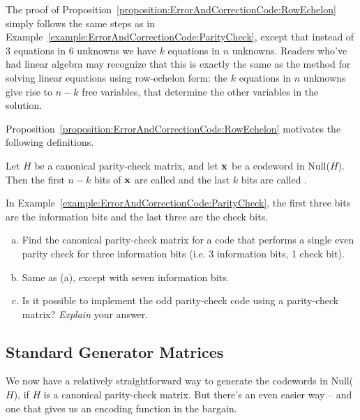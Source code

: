 The proof of Proposition~\ref{proposition:ErrorAndCorrectionCode:RowEchelon} simply follows the same steps as in Example~\ref{example:ErrorAndCorrectionCode:ParityCheck}, except that instead of 3 equations in 6 unknowns we have $k$ equations in $n$ unknowns. Readers who've had linear algebra may recognize that this is exactly the same as the method for solving linear equations using row-echelon form: the $k$ equations in $n$ unknowns give rise to $n-k$ free variables, that determine the other variables in the solution.

 Proposition~\ref{proposition:ErrorAndCorrectionCode:RowEchelon} motivates the following definitions.
 
 \begin{defn}
 Let $H$ be a canonical parity-check matrix, and let ${\bold x}$ be a codeword in Null($H$). Then the first $n-k$ bits of ${\bold x}$ are called   and the last $k$ bits are called .
\end{defn}
In Example~\ref{example:ErrorAndCorrectionCode:ParityCheck}, the first three bits are the information bits
and the last three are the check bits.
 
\begin{exercise}{}
\begin{enumerate}[(a)]
\item
Find the canonical parity-check matrix for a code that performs a single even parity check for  three information bits (i.e. 3 information bits, 1 check bit).
\item
Same as (a), except with seven information bits.
\item
Is it possible to implement the odd parity-check code using a parity-check matrix?  \emph{Explain} your answer.
\end{enumerate}
\end{exercise}

 
\subsection{Standard Generator Matrices}
\label{subsec:ErrorAndCorrectionCode:EncodingBlockLinearCodes:StandardGeneratorMatrix}
 
We now have a relatively straightforward way to generate the codewords in Null($H$), if $H$ is a canonical parity-check matrix. But there's an even easier way -- and one that gives us an encoding function in the bargain. 

